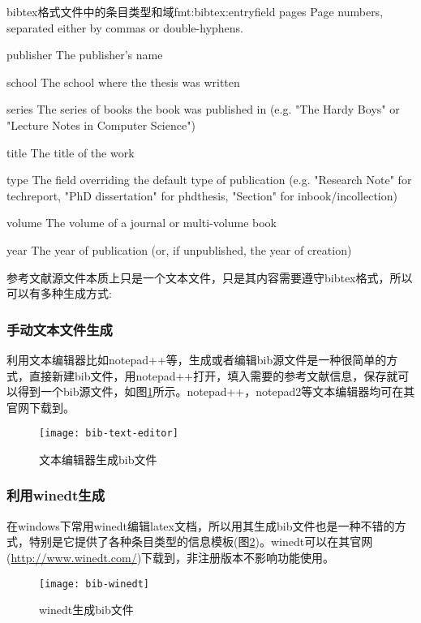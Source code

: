 \documentclass[twoside]{article} %
\begin{document}
\begin{codetex}{bibtex格式文件中的条目类型和域}{fmt:bibtex:entryfield}
pages
Page numbers, separated either by commas or double-hyphens.

publisher
The publisher's name

school
The school where the thesis was written

series
The series of books the book was published in (e.g. "The Hardy Boys" or "Lecture Notes in Computer Science")

title
The title of the work

type
The field overriding the default type of publication (e.g. "Research Note" for techreport, "{PhD} dissertation" for phdthesis, "Section" for inbook/incollection)

volume
The volume of a journal or multi-volume book

year
The year of publication (or, if unpublished, the year of creation)
\end{codetex}

参考文献源文件本质上只是一个文本文件，只是其内容需要遵守bibtex格式，所以可以有多种生成方式:

\subsubsection{手动文本文件生成}

利用文本编辑器比如notepad++等，生成或者编辑bib源文件是一种很简单的方式，直接新建bib文件，用notepad++打开，填入需要的参考文献信息，保存就可以得到一个bib源文件，如图\ref{bib:texteditor}所示。notepad++，notepad2等文本编辑器均可在其官网下载到。

\begin{figure}[!htb]
  \centering
  \texttt{[image: bib-text-editor]}
  \caption{文本编辑器生成bib文件}\label{bib:texteditor}
\end{figure}

\subsubsection{利用winedt生成}
在windows下常用winedt编辑latex文档，所以用其生成bib文件也是一种不错的方式，特别是它提供了各种条目类型的信息模板(图\ref{bib:winedt})。winedt可以在其官网(\url{http://www.winedt.com/})下载到，非注册版本不影响功能使用。

\begin{figure}[!htb]
  \centering
  \texttt{[image: bib-winedt]}
  \caption{winedt生成bib文件}\label{bib:winedt}
\end{figure}
\end{document}

